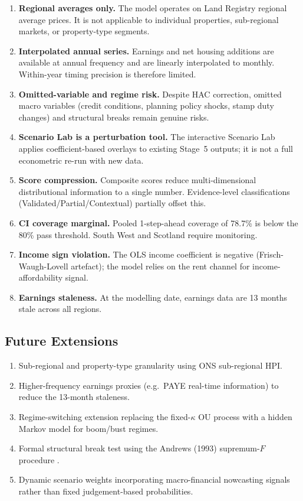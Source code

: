 \documentclass[11pt,a4paper]{article}
\theoremstyle{plain}
\theoremstyle{definition}
\newcommand{\kap}{\kappa}
\begin{document}
\begin{enumerate}[leftmargin=1.8em, label=\textbf{L\arabic*.}]
  \item \textbf{Regional averages only.}  The model operates on Land Registry
        regional average prices.  It is not applicable to individual properties,
        sub-regional markets, or property-type segments.
  \item \textbf{Interpolated annual series.}  Earnings and net housing additions
        are available at annual frequency and are linearly interpolated to monthly.
        Within-year timing precision is therefore limited.
  \item \textbf{Omitted-variable and regime risk.}  Despite HAC correction,
        omitted macro variables (credit conditions, planning policy shocks,
        stamp duty changes) and structural breaks remain genuine risks.
  \item \textbf{Scenario Lab is a perturbation tool.}  The interactive Scenario
        Lab applies coefficient-based overlays to existing Stage~5 outputs; it
        is not a full econometric re-run with new data.
  \item \textbf{Score compression.}  Composite scores reduce multi-dimensional
        distributional information to a single number.  Evidence-level
        classifications (Validated/Partial/Contextual) partially offset this.
  \item \textbf{CI coverage marginal.}  Pooled 1-step-ahead coverage of 78.7\%
        is below the 80\% pass threshold.  South West and Scotland require
        monitoring.
  \item \textbf{Income sign violation.}  The OLS income coefficient is negative
        (Frisch-Waugh-Lovell artefact); the model relies on the rent channel
        for income-affordability signal.
  \item \textbf{Earnings staleness.}  At the modelling date, earnings data
        are 13 months stale across all regions.
\end{enumerate}

\subsection{Future Extensions}

\begin{enumerate}[leftmargin=1.8em, label=\textbf{F\arabic*.}]
  \item Sub-regional and property-type granularity using ONS sub-regional HPI.
  \item Higher-frequency earnings proxies (e.g.\ PAYE real-time information)
        to reduce the 13-month staleness.
  \item Regime-switching extension replacing the fixed-$\kap$ OU process with
        a hidden Markov model for boom/bust regimes.
  \item Formal structural break test using the Andrews (1993) supremum-$F$
        procedure \cite{andrews1993}.
  \item Dynamic scenario weights incorporating macro-financial nowcasting signals
        rather than fixed judgement-based probabilities.
\end{enumerate}
\end{document}
